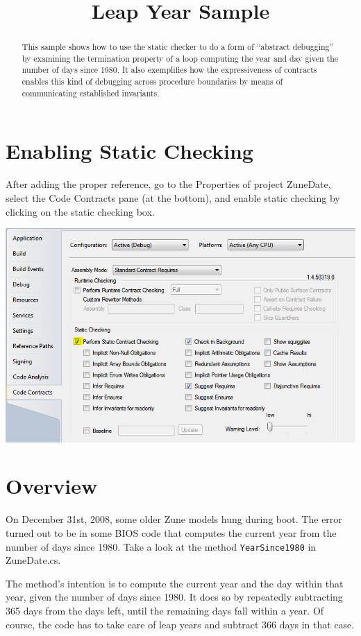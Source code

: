 \documentclass{article}
\title{Leap Year Sample}
\date{}
\newcommand{\ProjectName}{ZuneDate}
\begin{document}
\maketitle
\begin{abstract}
This sample shows how to use the static checker to do a form of
``abstract debugging'' by examining the termination property of a loop
computing the year and day given the number of days since 1980.  It
also exemplifies how the expressiveness of contracts enables this kind
of debugging across procedure boundaries by means of communicating
established invariants.

\end{abstract}



\section{Enabling Static Checking}
\label{sec:start}

After adding the proper reference, go to the Properties of project
\textsf{\ProjectName}, select the Code Contracts pane (at the bottom), and enable static
checking by clicking on the static checking box. 
\begin{center}
  \includegraphics[width=.8\columnwidth]{pane.png}
\end{center}

\section{Overview}
On December 31st, 2008, some older Zune models hung during boot. The
error turned out to be in some BIOS code that computes the current
year from the number of days since 1980. Take a look at the method
\lstinline{YearSince1980} in ZuneDate.cs.

The method's intention is to compute the current year and the day
within that year, given the number of days since 1980. It does so by
repeatedly subtracting 365 days from the days left, until the
remaining days fall within a year. Of course, the code has to take
care of leap years and subtract 366 days in that case.
\end{document}

